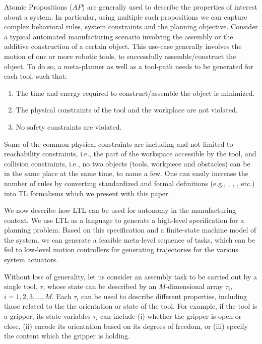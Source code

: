 \documentclass[3p,twocolumn,times,procedia]{elsarticle}
\begin{document}
Atomic Propositions ($AP$) are generally used to describe the properties of interest about a system. In particular, using multiple such propositions we can capture complex behavioral rules, system constraints and the planning objective. %
Consider a typical automated manufacturing scenario involving the assembly or the additive construction of a certain object. This use-case generally involves the motion of one or more robotic tools, to successfully assemble/construct the object. To do so, a meta-planner as well as a tool-path needs to be generated for each tool, such that:\vspace{-10pt}
\begin{enumerate}
\item The time and energy required to construct/assemble the object is minimized.
\item The physical constraints of the tool and the workplace are not violated.
\item No safety constraints are violated.
\end{enumerate}

Some of the common physical constraints are including and not limited to reachability constraints, i.e., the part of the workspace accessible by the tool, and collision constraints, i.e., no two objects (tools, workpiece and obstacles) can be in the same place at the same time, to name a few. %
One can easily increase the number of rules by converting standardized and formal definitions (e.g., \cite{NIST}, \cite{ISO-15066}, \cite{ISO-10218}, etc.) into TL formalisms which we present with this paper. 

We now describe how LTL can be used for autonomy in the manufacturing context. We use LTL as a language to generate a high-level specification for a planning problem. Based on this specification and a finite-state machine model of the system, we can generate a feasible meta-level sequence of tasks, which can be fed to low-level motion controllers for generating trajectories for the various system actuators. 

Without loss of generality, let us consider an assembly task to be carried out by a single tool, $\tau$, whose state can be described by an $M$-dimensional array $\tau_i,$ $i=1,2,3,...,M$. Each $\tau_i$ can be used to describe different properties, including those related to the the orientation or state of the tool. For example, if the tool is a gripper, its state variables $\tau_i$ can include (i) whether the gripper is open or close, (ii) encode its orientation based on its degrees of freedom, or (iii) specify the content which the gripper is holding. 
\end{document}
